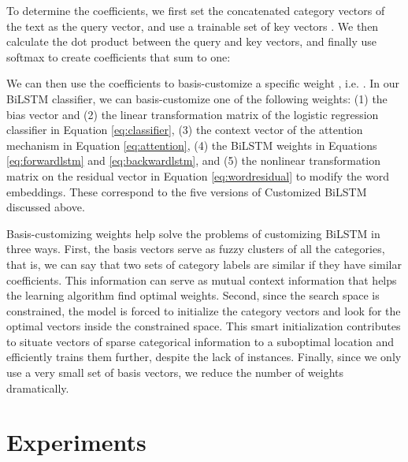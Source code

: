 \documentclass[11pt,a4paper]{article}
\begin{document}
To determine the  coefficients, we first set the concatenated category vectors of the text  as the query vector, and use a trainable set of key vectors . We then calculate the dot product between the query and key vectors, and finally use softmax to create  coefficients that sum to one:


We can then use the  coefficients to basis-customize a specific weight , i.e. . In our \mbox{BiLSTM} classifier, we can basis-customize one of the following weights: (1) the bias vector  and (2) the linear transformation matrix  of the logistic regression classifier in Equation \ref{eq:classifier}, (3) the context vector  of the attention mechanism in Equation \ref{eq:attention}, (4) the BiLSTM weights  in Equations \ref{eq:forwardlstm} and \ref{eq:backwardlstm}, and (5) the nonlinear transformation matrix  on the residual vector in Equation \ref{eq:wordresidual} to modify the word embeddings. These correspond to the five versions of Customized BiLSTM discussed above.

Basis-customizing weights help solve the problems of customizing \mbox{BiLSTM} in three ways. First, the basis vectors serve as fuzzy clusters of all the categories, that is, we can say that two sets of category labels are similar if they have similar  coefficients. This information can serve as mutual context information that helps the learning algorithm find optimal weights. Second, since the search space  is constrained, the model is forced to initialize the category vectors and look for the optimal vectors inside the constrained space. This smart initialization contributes to situate vectors of sparse categorical information to a suboptimal location and efficiently trains them further, despite the lack of instances. Finally, since we only use a very small set of basis vectors, we reduce the number of weights dramatically.

\section{Experiments}
\end{document}
